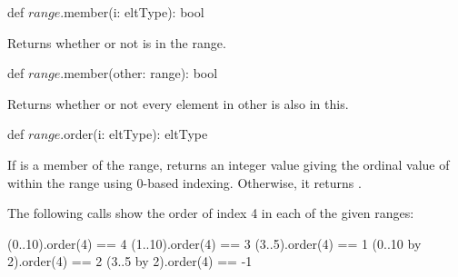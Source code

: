 \begin{protohead}
def $range$.member(i: eltType): bool
\end{protohead}
\begin{protobody}
Returns whether or not  is in the range.
\end{protobody}

\begin{protohead}
def $range$.member(other: range): bool
\end{protohead}
\begin{protobody}
Returns whether or not every element in other is also in this.
\end{protobody}

\begin{protohead}
def $range$.order(i: eltType): eltType
\end{protohead}
\begin{protobody}
If  is a member of the range, returns an integer value giving
the ordinal value of  within the range using 0-based indexing.
Otherwise, it returns .
\end{protobody}

\begin{example}
The following calls show the order of index 4 in each of the given
ranges:
\begin{chapel}
(0..10).order(4) == 4
(1..10).order(4) == 3
(3..5).order(4) == 1
(0..10 by 2).order(4) == 2
(3..5 by 2).order(4) == -1
\end{chapel}
\end{example}
